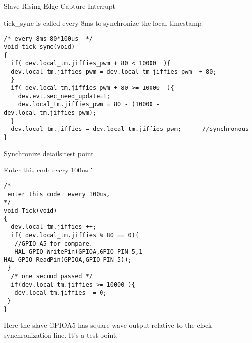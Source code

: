 \begin{frame}[fragile]{Slave Rising Edge Capture Interrupt}

tick\_sync is called every 8ms to synchronize the local timestamp:

\begin{lstlisting}
/* every 8ms 80*100us  */
void tick_sync(void)
{
  if( dev.local_tm.jiffies_pwm + 80 < 10000  ){
  dev.local_tm.jiffies_pwm = dev.local_tm.jiffies_pwm  + 80;
  }
  if( dev.local_tm.jiffies_pwm + 80 >= 10000  ){
    dev.evt.sec_need_update=1;
    dev.local_tm.jiffies_pwm = 80 - (10000 - dev.local_tm.jiffies_pwm);
  }
  dev.local_tm.jiffies = dev.local_tm.jiffies_pwm;		//synchronous
}
\end{lstlisting}

\end{frame}



\begin{frame}[fragile]{Synchronize details:test point}

Enter this code  every 100us：
\begin{lstlisting}
/*
 enter this code  every 100us。
*/
void Tick(void)
{
  dev.local_tm.jiffies ++;
  if( dev.local_tm.jiffies % 80 == 0){
   //GPIO A5 for compare.
   HAL_GPIO_WritePin(GPIOA,GPIO_PIN_5,1-HAL_GPIO_ReadPin(GPIOA,GPIO_PIN_5));
 }
  /* one second passed */
  if(dev.local_tm.jiffies >= 10000 ){
   dev.local_tm.jiffies  = 0;
 }
}
\end{lstlisting}
Here the slave GPIOA5 has square wave output relative to the clock synchronization line. It's a test point.
\end{frame}
